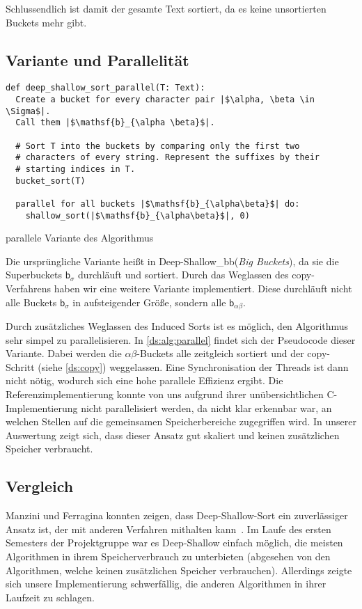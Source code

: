 Schlussendlich ist damit der gesamte Text sortiert, da es keine unsortierten Buckets mehr gibt.


\subsection{Variante und Parallelität}
\label{ds:zweite}

\begin{listing}[!ht]
\begin{verbatim}
def deep_shallow_sort_parallel(T: Text):
  Create a bucket for every character pair |$\alpha, \beta \in \Sigma$|.
  Call them |$\mathsf{b}_{\alpha \beta}$|.

  # Sort T into the buckets by comparing only the first two
  # characters of every string. Represent the suffixes by their
  # starting indices in T.
  bucket_sort(T)

  parallel for all buckets |$\mathsf{b}_{\alpha\beta}$| do:
    shallow_sort(|$\mathsf{b}_{\alpha\beta}$|, 0)
\end{verbatim}
\caption{parallele Variante des Algorithmus}
\label{ds:alg:parallel}
\end{listing}

\noindent Die ursprüngliche Variante heißt in \sacabench \glqq Deep-Shallow\_bb\grqq (\emph{Big Buckets}),
da sie die Superbuckets $\mathsf b_\sigma$ durchläuft und sortiert.
Durch das Weglassen des copy-Verfahrens haben wir eine weitere Variante implementiert.
Diese durchläuft nicht alle Buckets $\mathsf b_\sigma$ in aufsteigender Größe,
sondern alle $\mathsf b_{\alpha\beta}$.

Durch zusätzliches Weglassen des Induced Sorts ist es möglich,
den Algorithmus sehr simpel zu parallelisieren.
In \cref{ds:alg:parallel} findet sich der Pseudocode dieser Variante.
Dabei werden die $\alpha\beta$-Buckets alle zeitgleich sortiert und
der copy-Schritt (siehe \cref{ds:copy}) weggelassen.
Eine Synchronisation der Threads ist dann nicht nötig, wodurch sich eine hohe parallele Effizienz ergibt.
Die Referenzimplementierung konnte von uns aufgrund ihrer unübersichtlichen C-Implementierung nicht parallelisiert werden,
da nicht klar erkennbar war, an welchen Stellen auf die gemeinsamen Speicherbereiche zugegriffen wird.
In unserer Auswertung zeigt sich, dass dieser Ansatz gut skaliert und keinen zusätzlichen Speicher verbraucht.

\subsection{Vergleich}
Manzini und Ferragina konnten zeigen, dass Deep-Shallow-Sort ein zuverlässiger Ansatz ist, der mit anderen Verfahren mithalten kann~\cite{saca:4}.
Im Laufe des ersten Semesters der Projektgruppe war es Deep-Shallow einfach möglich,
die meisten Algorithmen in ihrem Speicherverbrauch zu unterbieten (abgesehen von den Algorithmen, welche keinen zusätzlichen Speicher verbrauchen).
Allerdings zeigte sich unsere Implementierung schwerfällig, die anderen Algorithmen in ihrer Laufzeit zu schlagen.